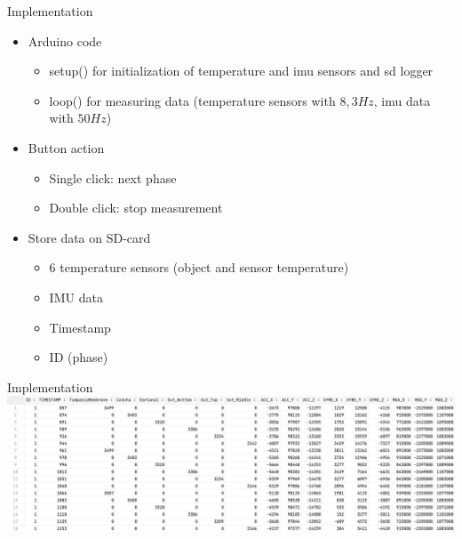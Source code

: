 \documentclass[en]{sdqbeamer}
\begin{document}
\begin{frame}{Implementation}
    \begin{itemize}
        \item Arduino code
        \begin{itemize}
            \item setup() for initialization of temperature and imu sensors and sd logger
            \item loop() for measuring data (temperature sensors with $8,3Hz$, imu data with $50Hz$)
        \end{itemize}
        \item Button action
        \begin{itemize}
            \item Single click: next phase
            \item Double click: stop measurement
        \end{itemize}
        \item Store data on SD-card
        \begin{itemize}
            \item 6 temperature sensors (object and sensor temperature)
            \item IMU data
            \item Timestamp
            \item ID (phase)
        \end{itemize}
    \end{itemize}
\end{frame}

\begin{frame}{Implementation}
    \includegraphics[width=\linewidth]{../thesis-doc/images/prototype/MeasurementRawDataSnippet_short.png} %
\end{frame}
\end{document}

